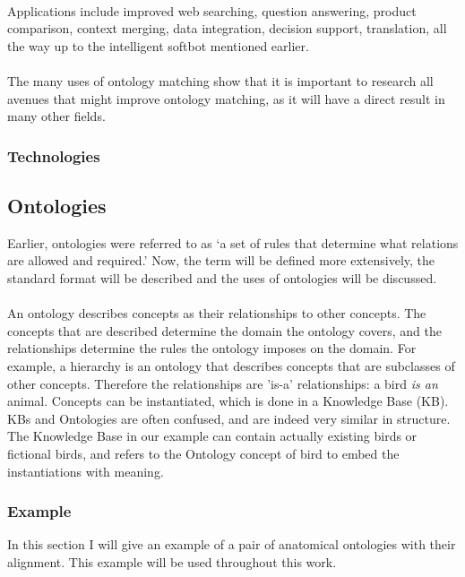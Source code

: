 \documentclass{article}
\begin{document}
 \paragraph{}
 Applications include improved web searching, question answering, product comparison, context merging, data integration, decision support, translation, all the way up to the intelligent softbot mentioned earlier. \cite{schreiber, future}
 \paragraph{}
 The many uses of ontology matching show that it is important to research all avenues that might improve ontology matching, as it will have a direct result in many other fields.
 \subsubsection{Technologies}
 
 \subsection{Ontologies}
 Earlier, ontologies were referred to as `a set of rules that determine what relations are allowed and required.' Now, the term will be defined more extensively, the standard format will be described and the uses of ontologies will be discussed.
 \paragraph{}
 An ontology describes concepts as their relationships to other concepts. The concepts that are described determine the domain the ontology covers, and the relationships determine the rules the ontology imposes on the domain. For example, a hierarchy is an ontology that describes concepts that are subclasses of other concepts. Therefore the relationships are 'is-a' relationships: a bird \emph{is an} animal.
 Concepts can be instantiated, which is done in a Knowledge Base (KB). KBs and Ontologies are often confused, and are indeed very similar in structure. The Knowledge Base in our example can contain actually existing birds or fictional birds, and refers to the Ontology concept of bird to embed the instantiations with meaning\cite{ontologyGuru}.
 
 \subsubsection{Example} \label{example}
 In this section I will give an example of a pair of anatomical ontologies with their alignment. This example will be used throughout this work.
 
\end{document}
